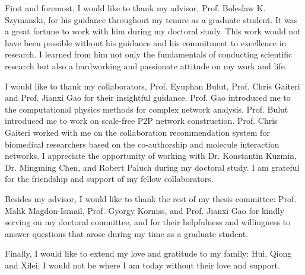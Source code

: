 
First and foremost, I would like to thank my advisor,
Prof. Boleslaw K. Szymanski, for his guidance throughout my tenure
as a graduate student. It was a great fortune to work with him during my doctoral study. This work would not have been possible without his guidance and his commitment to excellence in research. I learned from him not only the fundamentals of conducting scientific research but also a hardworking and passionate attitude on my work and life.

I would like to thank my collaborators, Prof. Eyuphan Bulut, Prof. Chris Gaiteri and Prof. Jianxi Gao for their insightful guidance. Prof. Gao introduced me to the computational physics methods for complex network analysis. Prof. Bulut introduced me to work on scale-free P2P network construction. Prof. Chris Gaiteri worked with me on the collaboration recommendation system for biomedical researchers based on the co-authorship and molecule interaction networks. I appreciate the opportunity of working with Dr. Konstantin Kuzmin, Dr. Mingming Chen, and Robert Paluch during my doctoral study. I am grateful for the friendship and support of my fellow collaborators.

Besides my advisor, I would like to thank the rest of my thesis committee: Prof. Malik Magdon-Ismail, Prof. Gyorgy Korniss, and Prof. Jianxi Gao for kindly serving on my doctoral committee, and for their helpfulness and willingness to answer questions that arose during my time as a graduate student.

Finally, I would like to extend my love and gratitude to my family: Hui, Qiong and Xilei. I would not be where I am today without their love and support.
